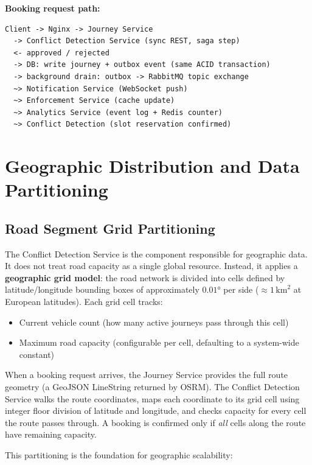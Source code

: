 \documentclass[12pt,a4paper]{article}
\begin{document}
\textbf{Booking request path:}

\begin{lstlisting}
Client -> Nginx -> Journey Service
  -> Conflict Detection Service (sync REST, saga step)
  <- approved / rejected
  -> DB: write journey + outbox event (same ACID transaction)
  -> background drain: outbox -> RabbitMQ topic exchange
  ~> Notification Service (WebSocket push)
  ~> Enforcement Service (cache update)
  ~> Analytics Service (event log + Redis counter)
  ~> Conflict Detection (slot reservation confirmed)
\end{lstlisting}

\section{Geographic Distribution and Data Partitioning}

\subsection{Road Segment Grid Partitioning}

The Conflict Detection Service is the component responsible for geographic data. It does not treat road capacity as a single global resource. Instead, it applies a \textbf{geographic grid model}: the road network is divided into cells defined by latitude/longitude bounding boxes of approximately $0.01°$ per side (${\approx}1\,\text{km}^2$ at European latitudes). Each grid cell tracks:

\begin{itemize}[leftmargin=*]
  \item Current vehicle count (how many active journeys pass through this cell)
  \item Maximum road capacity (configurable per cell, defaulting to a system-wide constant)
\end{itemize}

When a booking request arrives, the Journey Service provides the full route geometry (a GeoJSON LineString returned by OSRM). The Conflict Detection Service walks the route coordinates, maps each coordinate to its grid cell using integer floor division of latitude and longitude, and checks capacity for every cell the route passes through. A booking is confirmed only if \emph{all} cells along the route have remaining capacity.

This partitioning is the foundation for geographic scalability:
\end{document}
